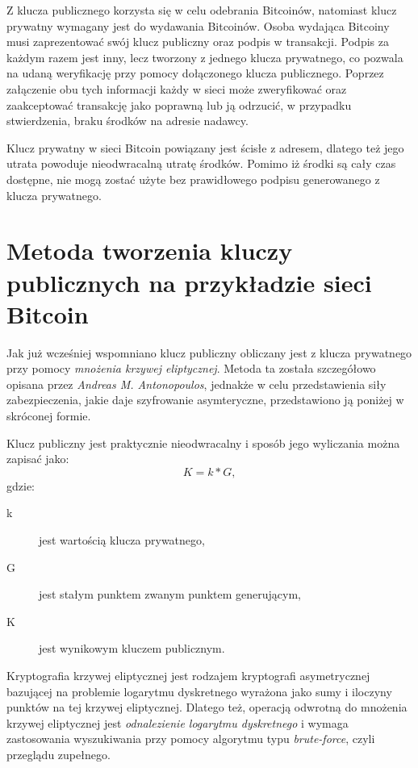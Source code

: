 \documentclass[12pt, twoside, final, openany]{mgr}
\begin{document}
\indent Z klucza publicznego korzysta się w celu odebrania Bitcoinów, natomiast klucz prywatny wymagany jest do wydawania Bitcoinów. Osoba wydająca Bitcoiny musi zaprezentować swój klucz publiczny oraz podpis w transakcji. Podpis za każdym razem jest inny, lecz tworzony z jednego klucza prywatnego, co pozwala na udaną weryfikację przy pomocy dołączonego klucza publicznego. Poprzez załączenie obu tych informacji każdy w sieci może zweryfikować oraz zaakceptować transakcję jako poprawną lub ją odrzucić, w przypadku stwierdzenia, braku środków na adresie nadawcy. 

\indent Klucz prywatny w sieci Bitcoin powiązany jest ścisłe z adresem, dlatego też jego utrata powoduje nieodwracalną utratę środków. Pomimo iż środki są cały czas dostępne, nie mogą zostać użyte bez prawidłowego podpisu generowanego z klucza prywatnego.

\section{Metoda tworzenia kluczy publicznych na przykładzie sieci Bitcoin} \label{sec:tworzenieKluczyPublicznych}
\indent Jak już wcześniej wspomniano klucz publiczny obliczany jest z klucza prywatnego przy pomocy \textit{mnożenia krzywej eliptycznej}. Metoda ta została szczegółowo opisana przez \textit{Andreas M. Antonopoulos}\cite{Mastering}, jednakże w celu przedstawienia siły zabezpieczenia, jakie daje szyfrowanie asymteryczne, przedstawiono ją poniżej w skróconej formie. 

\indent Klucz publiczny jest praktycznie nieodwracalny i sposób jego wyliczania można zapisać jako:
\begin{equation}
\label{eq:1}
  K = k*G, 
\end{equation} 
gdzie:
\begin{description}
\item[k] jest wartością klucza prywatnego,
\item[G] jest stałym punktem zwanym punktem generującym,
\item[K] jest wynikowym kluczem publicznym.
\end{description}

Kryptografia krzywej eliptycznej jest rodzajem kryptografi asymetrycznej bazującej na problemie logarytmu dyskretnego wyrażona jako sumy i iloczyny punktów na tej krzywej eliptycznej. Dlatego też, operacją odwrotną do mnożenia krzywej eliptycznej jest \textit{odnalezienie logarytmu dyskretnego} i wymaga zastosowania wyszukiwania przy pomocy algorytmu typu \textit{brute-force}, czyli przeglądu zupełnego.
\end{document}
